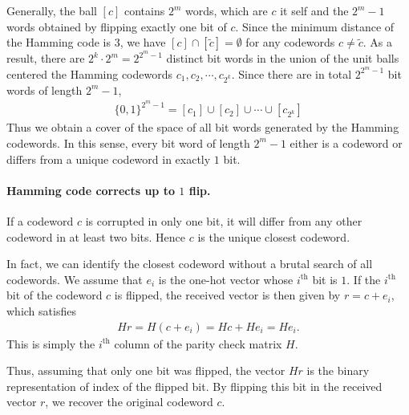 \documentclass{article}
\numberwithin{equation}{section}
\newcommand{\wt}{\widetilde}
\theoremstyle{plain}
\theoremstyle{definition}
\begin{document}
Generally, the ball $[c]$ contains $2^m$ words, which are $c$ it self and the $2^m-1$ words obtained by flipping exactly one bit of $c$. Since the minimum distance of the Hamming code is $3$, we have $[c]\cap[\wt c]=\emptyset$ for any codewords $c\neq \wt c$. As a result, there are $2^k\cdot 2^m=2^{2^m-1}$ distinct bit words in the union of the unit balls centered the Hamming codewords $c_1,c_2,\cdots, c_{2^k}$. Since there are in total $2^{2^m-1}$ bit words of length $2^m-1$,
\begin{align*}
	\{0,1\}^{2^m-1}=[c_1]\cup[c_2]\cup\cdots\cup\left[c_{2^k}\right]
\end{align*}
Thus we obtain a cover of the space of all bit words generated by the Hamming codewords. In this sense, every bit word of length $2^m-1$ either is a codeword or differs from a unique codeword in exactly $1$ bit.

\paragraph{Hamming code corrects up to $1$ flip.} If a codeword $c$ is corrupted in only one bit, it will differ from any other codeword in at least two bits. Hence $c$ is the unique closest codeword.

In fact, we can identify the closest codeword without a brutal search of all codewords. We assume that $e_i$ is the one-hot vector whose $i^\text{th}$ bit is $1$. If the $i^\text{th}$ bit of the codeword $c$ is flipped, the received vector is then given by $r=c+e_i$, which satisfies
\begin{align*}
	Hr=H(c+e_i)=Hc+He_i=He_i.
\end{align*}
This is simply the $i^\text{th}$ column of the parity check matrix $H$.

Thus, assuming that only one bit was flipped, the vector $Hr$ is the binary representation of index of the flipped bit. By flipping this bit in the received vector $r$, we recover the original codeword $c$.
\end{document}
